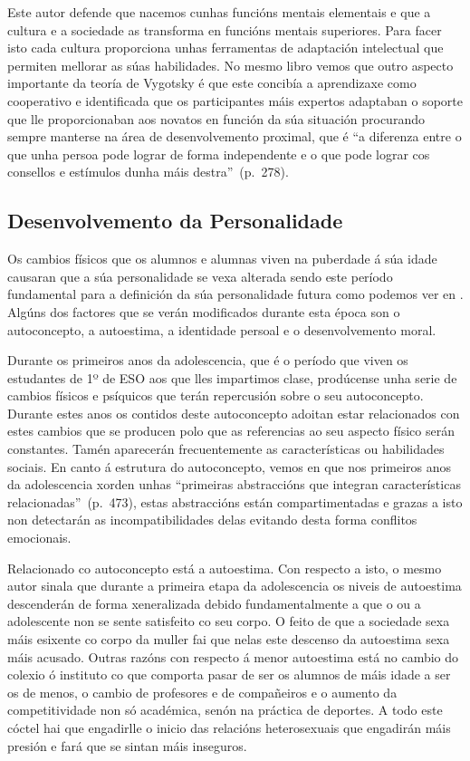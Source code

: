 Este autor defende que nacemos cunhas funcións mentais elementais e que a cultura e a sociedade as transforma en funcións mentais superiores. Para facer isto cada cultura proporciona unhas ferramentas de adaptación intelectual que permiten mellorar as súas habilidades. No mesmo libro vemos que outro aspecto importante da teoría de Vygotsky é que este concibía a aprendizaxe como cooperativo e identificada que os participantes máis expertos adaptaban o soporte que lle proporcionaban aos novatos en función da súa situación procurando sempre manterse na área de desenvolvemento proximal, que é ``a diferenza entre o que unha persoa pode lograr de forma independente e o que pode lograr cos consellos e estímulos dunha máis destra''~(p.~278).

\subsection{Desenvolvemento da Personalidade}
Os cambios físicos que os alumnos e alumnas viven na puberdade á súa idade causaran que a súa personalidade se vexa alterada sendo este período fundamental para a definición da súa personalidade futura como podemos ver en . Algúns dos factores que se verán modificados durante esta época son o autoconcepto, a autoestima, a identidade persoal e o desenvolvemento moral.

Durante os primeiros anos da adolescencia, que é o período que viven os estudantes de 1º de ESO aos que lles impartimos clase, prodúcense unha serie de cambios físicos e psíquicos que terán repercusión sobre o seu autoconcepto. Durante estes anos os contidos deste autoconcepto adoitan estar relacionados con estes cambios que se producen polo que as referencias ao seu aspecto físico serán constantes. Tamén aparecerán frecuentemente as características ou habilidades sociais. En canto á estrutura do autoconcepto, vemos en  que nos primeiros anos da adolescencia xorden unhas ``primeiras abstraccións que integran características relacionadas''~(p.~473), estas abstraccións están compartimentadas e grazas a isto non detectarán as incompatibilidades delas evitando desta forma conflitos emocionais.

Relacionado co autoconcepto está a autoestima. Con respecto a isto, o mesmo autor sinala que durante a primeira etapa da adolescencia os niveis de autoestima descenderán de forma xeneralizada debido fundamentalmente a que o ou a adolescente non se sente satisfeito co seu corpo. O feito de que a sociedade sexa máis esixente co corpo da muller fai que nelas este descenso da autoestima sexa máis acusado. Outras razóns con respecto á menor autoestima está no cambio do colexio ó instituto co que comporta pasar de ser os alumnos de máis idade a ser os de menos, o cambio de profesores e de compañeiros e o aumento da competitividade non só académica, senón na práctica de deportes. A todo este cóctel hai que engadirlle o inicio das relacións heterosexuais que engadirán máis presión e fará que se sintan máis inseguros.

